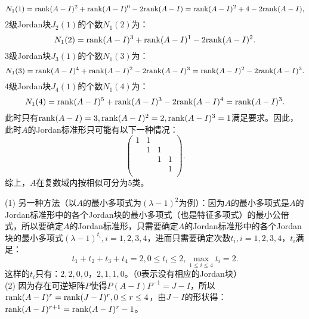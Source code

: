 \begin{enumerate}[1~]
\begin{enumerate}[1.~]
\begin{solution}
\[N_1(1)={\rm rank}(A-I)^2+{\rm rank}(A-I)^0-2{\rm rank}(A-I)={\rm rank}(A-I)^2+4-2{\rm rank}(A-I),
\]
$2$级Jordan块$J_2(1)$的个数$N_1(2)$为：\[
N_1(2)={\rm rank}(A-I)^3+{\rm rank}(A-I)^1-2{\rm rank}(A-I)^2.
\]
$3$级Jordan块$J_3(1)$的个数$N_1(3)$为：\[
N_1(3)={\rm rank}(A-I)^4+{\rm rank}(A-I)^2-2{\rm rank}(A-I)^3={\rm rank}(A-I)^2-2{\rm rank}(A-I)^3.
\]
$4$级Jordan块$J_4(1)$的个数$N_1(4)$为：\[
N_1(4)={\rm rank}(A-I)^5+{\rm rank}(A-I)^3-2{\rm rank}(A-I)^4={\rm rank}(A-I)^3.
\]
此时只有${\rm rank}(A-I)=3, {\rm rank}(A-I)^2=2, {\rm rank}(A-I)^3=1$满足要求。因此，此时$A$的Jordan标准形只可能有以下一种情况：\[
\left( \begin{matrix}
	1&		1&		&		\\
	&		1&		1&		\\
	&		&		1&		1\\
	&		&		&		1\\
\end{matrix} \right) .
\]
综上，$A$在复数域内按相似可分为5类。
\end{solution}
\begin{remark}
(1) 另一种方法（以$A$的最小多项式为$(\lambda-1)^2$为例）：因为$A$的最小多项式是$A$的Jordan标准形中的各个Jordan块的最小多项式（也是特征多项式）的最小公倍式，所以要确定$A$的Jordan标准形，只需要确定$A$的Jordan标准形中的各个Jordan块的最小多项式$(\lambda-1)^{t_i}, i=1, 2, 3, 4$，进而只需要确定次数$t_i, i=1, 2, 3, 4$，$t_i$满足：\[
t_1+t_2+t_3+t_4=2, 0\le t_i\le 2, \max_{1\le i\le 4}t_i=2.
\]
这样的$t_i$只有：$2, 2, 0, 0$，$2, 1, 1, 0$。（0表示没有相应的Jordan块）\\
(2) 因为存在可逆矩阵$P$使得$P(A-I)P^{-1}=J-I$，所以${\rm rank}(A-I)^r={\rm rank}(J-I)^r, 0\le r \le 4$，由$J-I$的形状得：${\rm rank}(A-I)^{r+1}={\rm rank}(A-I)^r-1$。
\end{remark}

\end{enumerate}


\end{enumerate}
